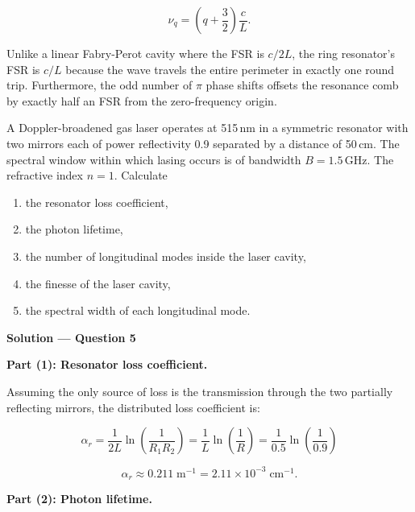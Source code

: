 \begin{equation*}
  \boxed{\nu_q = \left(q + \frac{3}{2}\right)\frac{c}{L}.}
\end{equation*}

Unlike a linear Fabry-Perot cavity where the FSR is $c/2L$, the ring resonator's FSR is $c/L$ because the wave travels the entire perimeter in exactly one round trip. Furthermore, the odd number of $\pi$ phase shifts offsets the resonance comb by exactly half an FSR from the zero-frequency origin.


\begin{question}[Question 5]A Doppler-broadened gas laser operates at 515\,nm in a symmetric resonator
with two mirrors each of power reflectivity 0.9 separated by a distance of 50\,cm. The spectral
window within which lasing occurs is of bandwidth $B=1.5$\,GHz. The refractive index $n=1$.
Calculate
\begin{enumerate}[label=(\arabic*)]
  \item the resonator loss coefficient,
  \item the photon lifetime,
  \item the number of longitudinal modes inside the laser cavity,
  \item the finesse of the laser cavity,
  \item the spectral width of each longitudinal mode.
\end{enumerate}
\end{question}

\textbf{\large Solution --- Question 5}

\textbf{Part (1): Resonator loss coefficient.}

Assuming the only source of loss is the transmission through the two partially reflecting mirrors, the distributed loss coefficient is:

\begin{equation*}
  \alpha_r = \frac{1}{2L}\ln\left(\frac{1}{R_1 R_2}\right) = \frac{1}{L}\ln\left(\frac{1}{R}\right) = \frac{1}{0.5}\ln\left(\frac{1}{0.9}\right)
\end{equation*}

\begin{equation*}
  \boxed{\alpha_r \approx 0.211\;\text{m}^{-1} = 2.11\times10^{-3}\;\text{cm}^{-1}.}
\end{equation*}

\textbf{Part (2): Photon lifetime.}


